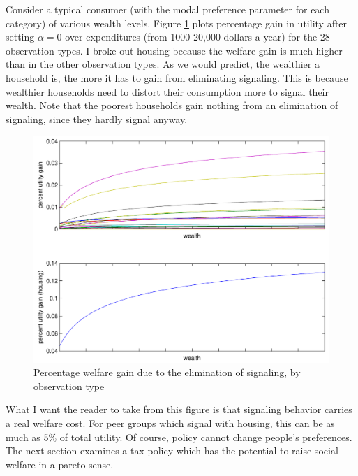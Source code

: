\documentclass[12pt]{article}
\begin{document}
Consider a typical consumer (with the modal preference parameter for each category) of various wealth levels.  
Figure \ref{fig:uchnge} plots percentage gain in utility after setting $\alpha = 0$ over expenditures (from 1000-20,000 dollars a year) for the 28  observation types.
I broke out housing because the welfare gain is much higher than in the other observation types.
As we would  predict, the wealthier a household is, the more it has to gain from eliminating signaling.
This is because wealthier households need to distort their consumption more to signal their wealth. 
Note that the poorest households gain nothing from an elimination of signaling, since they hardly signal anyway.

\begin{figure}
    \begin{center}
	\includegraphics[scale=.8]{pics/uchnge_cropped.pdf}
    \end{center}
    \caption{Percentage welfare gain due to the elimination of signaling, by observation type}
    \label{fig:uchnge}
\end{figure}
What I want the reader to take from this figure is that signaling behavior carries a real welfare cost.  For peer groups which signal with housing, this can be as much as 5\% of total utility.  Of course, policy cannot change people's preferences.  The next section examines a tax policy which has the potential to raise social welfare in a pareto sense.
\end{document}
